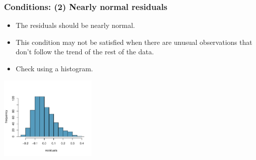 \documentclass[notes,11pt, aspectratio=169]{beamer}
\begin{document}
\begin{frame}
\frametitle{Conditions: (2) Nearly normal residuals}

\begin{itemize}

\item The residuals should be nearly normal.

\pause

\item This condition may not be satisfied when there are unusual observations that don't follow the trend of the rest of the data.

\pause

\item Check using a histogram.

\end{itemize}

\begin{center}
\includegraphics[width=0.35\textwidth]{graphs/l08f10}
\end{center}

\end{frame}

\end{document}
